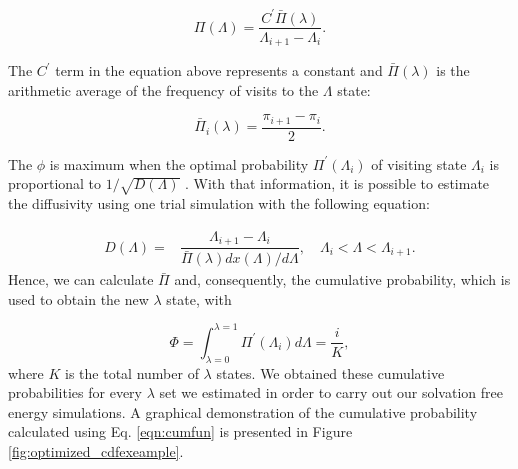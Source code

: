     \begin{equation}
    \Pi (\Lambda) = \dfrac{C^{'} \bar{\Pi} (\lambda)}{\Lambda_{i+1} - \Lambda_{i}}.
    \label{eqn:plambda}
    \end{equation}
    
    The $C^{'} $ term in the equation above represents a constant and $\bar{\Pi} (\lambda)$ is the arithmetic average of the frequency of visits to the $\Lambda$ state:
    
    \begin{equation}
    \bar{\Pi}_{i} (\lambda) = \dfrac{\pi_{i+1} - \pi_{i}}{2}.
    \label{eqn:barplambda}
    \end{equation}
    
    The $\phi$ is maximum when the optimal probability $\Pi^{'}(\Lambda_{i})$ of visiting state $\Lambda_{i}$ is proportional to $1/\sqrt{D(\Lambda)}$ \cite{trebst2004}. With that information, it is possible to estimate the diffusivity using one trial simulation with the following equation:
    
    \begin{equation}
    \begin{aligned}
    D(\Lambda) {}=& \dfrac{\Lambda_{i+1} - \Lambda_{i}}{\bar{\Pi} (\lambda) {dx(\Lambda)}/{d \Lambda}}, \quad \Lambda_{i} < \Lambda < \Lambda_{i+1}.
    \end{aligned}
    \label{eqn:diff}
    \end{equation}    
    Hence, we can calculate $\bar{\Pi} $ and, consequently, the cumulative probability, which is used to obtain the new $\lambda$ state, with
    
    \begin{equation}
    \Phi = \int_{\lambda =0}^{\lambda =1} \Pi^{'}(\Lambda_{i}) d \Lambda = \dfrac{i}{K},
    \label{eqn:cumfun}
    \end{equation}
    where $K$ is the total number of $\lambda$ states. We obtained these cumulative probabilities for every $\lambda$ set we estimated in order to carry out our solvation free energy simulations. A graphical demonstration of the cumulative probability calculated using Eq. \ref{eqn:cumfun} is presented in Figure \ref{fig:optimized_cdfexeample}.
    
